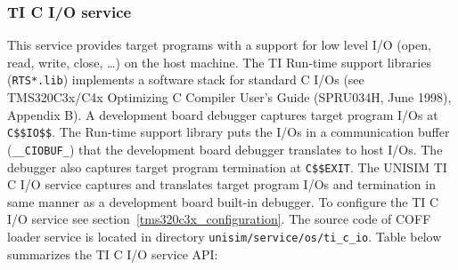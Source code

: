 \newpage
\subsubsection{TI C I/O service}
\label{tms320c3x_ti_c_io}

This service provides target programs with a support for low level I/O (open, read, write, close, \ldots) on the host machine.
The TI Run-time support libraries (\texttt{RTS*.lib}) implements a software stack for standard C I/Os (see TMS320C3x/C4x Optimizing C Compiler User’s Guide (SPRU034H, June 1998), Appendix B).
A development board debugger captures target program I/Os at \texttt{C\$\$IO\$\$}. The Run-time support library puts the I/Os in a communication buffer (\texttt{\_\_CIOBUF\_}) that the development board debugger translates to host I/Os. The debugger also captures target program termination at \texttt{C\$\$EXIT}.
The UNISIM TI C I/O service captures and translates target program I/Os and termination in same manner as a development board built-in debugger.
To configure the TI C I/O service see section~\ref{tms320c3x_configuration}.
The source code of COFF loader service is located in directory \texttt{unisim/service/os/ti\_c\_io}.
\noindent Table below summarizes the TI C I/O service API:

